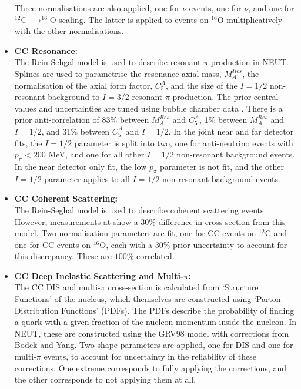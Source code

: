 \begin{itemize}
Three normalisations are also applied, one for $\nu$ events, one for $\bar{\nu}$, and one for $^{12}$C~$\rightarrow ^{16}$O scaling. The latter is applied to events on $^{16}$O multiplicatively with the other normalisations.

\item \textbf{CC Resonance:}\\
The Rein-Sehgal model\cite{reinessehgal} is used to describe resonant $\pi$ production in \textsc{NEUT}. Splines are used to parametrise the resonance axial mass, $M^{Res}_{A}$, the normalisation of the axial form factor, $C^{A}_{5}$, and the size of the $I=1/2$ non-resonant background to $I=3/2$ resonant $\pi$ production. The prior central values and uncertainties are tuned using bubble chamber data \cite{bubblechamber}. There is a prior anti-correlation of 83$\%$ between $M^{Res}_{A}$ and $C^{A}_{5}$, 1$\%$ between $M^{Res}_{A}$ and $I=1/2$, and 31$\%$ between $C^{A}_{5}$ and $I=1/2$. In the joint near and far detector fits, the $I=1/2$ parameter is split into two, one for anti-neutrino events with $p_{\pi} < 200$ MeV, and one for all other $I=1/2$ non-resonant background events. In the near detector only fit, the low $p_{\pi}$ parameter is not fit, and the other $I=1/2$ parameter applies to all $I=1/2$ non-resonant background events.

\item \textbf{CC Coherent Scattering:}\\
The Rein-Seghal model \cite{reincoh} is used to describe coherent scattering events.
However, measurements at \minerva show a $30\%$ difference in cross-section from this model. Two normalisation parameters are fit, one for CC events on $^{12}$C and one for CC events on $^{16}$O, each with a $30\%$ prior uncertainty to account for this discrepancy. These are $100\%$ correlated.

\item \textbf{CC Deep Inelastic Scattering and Multi-$\pi$:}\\
The CC DIS and multi-$\pi$ cross-section is calculated from `Structure Functions' of the nucleus, which themselves are constructed using `Parton Distribution Functions' (PDFs). The PDFs describe the probability of finding a quark with a given fraction of the nucleon momentum inside the nucleon. In \textsc{NEUT}, these are constructed using the GRV98\cite{grv98} model with corrections from Bodek and Yang\cite{by}. Two shape parameters are applied, one for DIS and one for multi-$\pi$ events, to account for uncertainty in the reliability of these corrections. One extreme corresponds to fully applying the corrections, and the other corresponds to not applying them at all.


\end{itemize}
